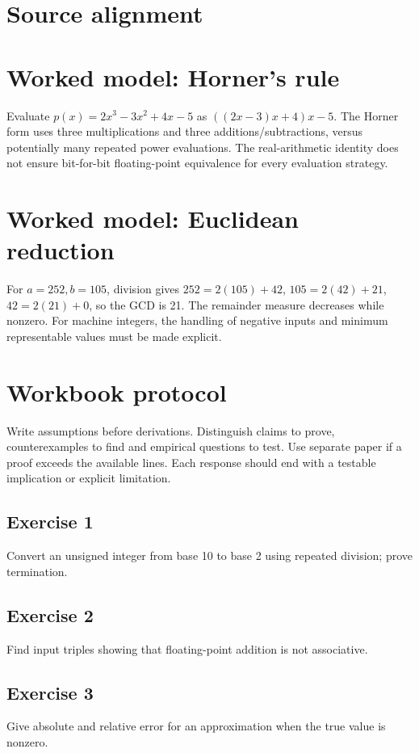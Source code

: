 \documentclass[11pt,letterpaper]{article}
\begin{document}
\tableofcontents
\clearpage
{}
\section{Source alignment}

\section{Worked model: Horner's rule}
Evaluate $p(x)=2x^3-3x^2+4x-5$ as $((2x-3)x+4)x-5$. The Horner form uses three multiplications and three additions/subtractions, versus potentially many repeated power evaluations. The real-arithmetic identity does not ensure bit-for-bit floating-point equivalence for every evaluation strategy.
\section{Worked model: Euclidean reduction}
For $a=252,b=105$, division gives $252=2(105)+42$, $105=2(42)+21$, $42=2(21)+0$, so the GCD is 21. The remainder measure decreases while nonzero. For machine integers, the handling of negative inputs and minimum representable values must be made explicit.

\section{Workbook protocol}
Write assumptions before derivations. Distinguish claims to prove, counterexamples to find and empirical questions to test. Use separate paper if a proof exceeds the available lines. Each response should end with a testable implication or explicit limitation.

\subsection{Exercise 1}\noindent Convert an unsigned integer from base 10 to base 2 using repeated division; prove termination.
\subsection{Exercise 2}\noindent Find input triples showing that floating-point addition is not associative.
\subsection{Exercise 3}\noindent Give absolute and relative error for an approximation when the true value is nonzero.
\end{document}
